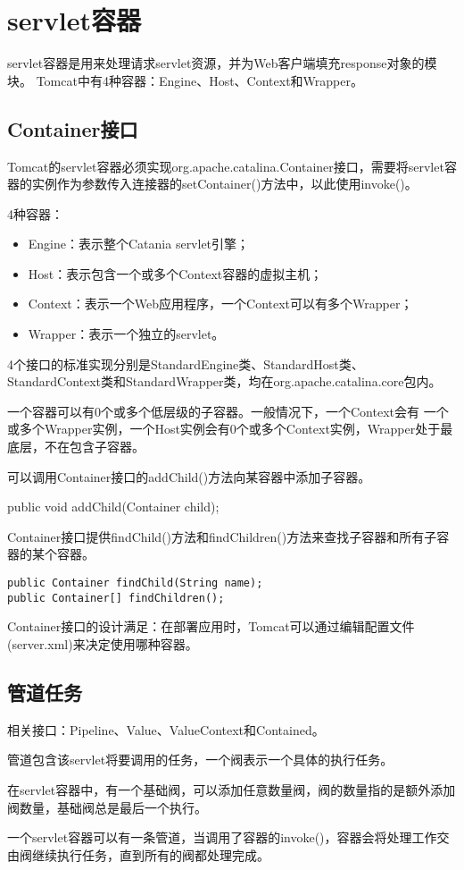 \chapter{servlet容器}
servlet容器是用来处理请求servlet资源，并为Web客户端填充response对象的模块。
Tomcat中有4种容器：Engine、Host、Context和Wrapper。
\section{Container接口}
Tomcat的servlet容器必须实现org.apache.catalina.Container接口，需要将servlet容器的实例作为参数传入连接器的setContainer()方法中，以此使用invoke()。
\par 4种容器：
\begin{itemize}
	\item Engine：表示整个Catania servlet引擎；
	\item Host：表示包含一个或多个Context容器的虚拟主机；
	\item Context：表示一个Web应用程序，一个Context可以有多个Wrapper；
	\item Wrapper：表示一个独立的servlet。
\end{itemize}
\par 4个接口的标准实现分别是StandardEngine类、StandardHost类、StandardContext类和StandardWrapper类，均在org.apache.catalina.core包内。
\par 一个容器可以有0个或多个低层级的子容器。一般情况下，一个Context会有
一个或多个Wrapper实例，一个Host实例会有0个或多个Context实例，Wrapper处于最底层，不在包含子容器。
\par 可以调用Container接口的addChild()方法向某容器中添加子容器。
\par public void addChild(Container child);
\par Container接口提供findChild()方法和findChildren()方法来查找子容器和所有子容器的某个容器。
\begin{lstlisting}
public Container findChild(String name);
public Container[] findChildren();
\end{lstlisting}
\par Container接口的设计满足：在部署应用时，Tomcat可以通过编辑配置文件
(server.xml)来决定使用哪种容器。

\section{管道任务}
相关接口：Pipeline、Value、ValueContext和Contained。
\par 管道包含该servlet将要调用的任务，一个阀表示一个具体的执行任务。
\par 在servlet容器中，有一个基础阀，可以添加任意数量阀，阀的数量指的是额外添加阀数量，基础阀总是最后一个执行。
\par 一个servlet容器可以有一条管道，当调用了容器的invoke()，容器会将处理工作交由阀继续执行任务，直到所有的阀都处理完成。